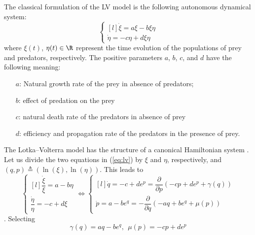 %
\begin{exmp}
    The classical formulation of the LV model is the following autonomous dynamical system:
    \begin{equation}\label{eq:lv}
        \left\{ 
            \begin{matrix*}[l]
                \dot{\xi} = a\xi - b\xi\eta\\
                \dot{\eta} = -c\eta + d\xi\eta
            \end{matrix*}\right.
    \end{equation}
    where $\xi(t)$, $\eta(t)\in\R$ represent the time evolution of the populations of prey and predators, respectively. The positive parameters $a$, $b$, $c$, and $d$ have the following meaning:
    \begin{itemize}
        \item [$a$:] Natural growth rate of the prey in absence of predators;
        \item [$b$:] effect of predation on the prey
        \item [$c$:] natural death rate of the predators in absence of prey
        \item [$d$:] efficiency and propagation rate of the predators in the presence of prey.
    \end{itemize}
    The Lotka--Volterra model has the structure of a canonical Hamiltonian system \cite{vulpiani2010chaos}. 
    Let us divide the two equations in (\ref{eq:lv}) by $\xi$ and $\eta$, respectively, and $(q,p)\triangleq(\ln(\xi),\ln(\eta))$. This leads to
	\begin{equation*}
	    \left\{ 
	        \begin{matrix*}[l]
	            \dfrac{\dot{\xi}}{\xi} = a - b\eta\\
	            \dfrac{\dot{\eta}}{\eta} = -c + d\xi
	        \end{matrix*}\right.
    \Leftrightarrow
    \left\{ 
	\begin{matrix*}[l]
	\dot{q} = -c + de^p = \dfrac{\partial}{\partial p}(-cp+de^p + \gamma(q))\\
	\dot{p} = a - be^q = -\dfrac{\partial}{\partial q}(-aq+be^q + \mu(p))
	\end{matrix*}\right.
	\end{equation*}
	. Selecting 
	\begin{equation}
	    \gamma(q) = aq-be^q,~~ \mu(p) = -cp+de^p   
	\end{equation}

\end{exmp}
